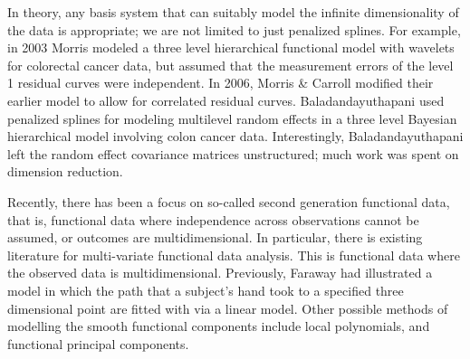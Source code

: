 In theory, any basis system that can suitably model the infinite dimensionality of the data is appropriate; 
we are not limited to just penalized splines.  
For example, in 2003 Morris modeled a three level hierarchical functional model with wavelets for colorectal cancer data, but assumed that the measurement errors of the level 1 residual curves were independent\cite{morris_wavelet-based_2003}.  
In 2006, Morris \& Carroll modified their earlier model to allow for correlated residual curves\cite{morris_wavelet-based_2006}.  Baladandayuthapani used penalized splines for modeling multilevel random effects in a three level Bayesian hierarchical model involving colon cancer data\cite{baladandayuthapani_bayesian_2008}.  
Interestingly, Baladandayuthapani left the random effect covariance matrices unstructured; much work was spent on dimension reduction.  

Recently, there has been a focus on so-called second generation functional data, that is, functional data where independence across observations cannot be assumed, or outcomes are multidimensional.  
In particular, there is existing literature for multi-variate functional data analysis.  
This is functional data where the observed data is multidimensional\cite{koner_second-generation_2023}.  
Previously, Faraway had illustrated a model in which the path that a subject's hand took to a specified three dimensional point are fitted with via a linear model\cite{faraway_regression_1997}.  
Other possible methods of modelling the smooth functional components include local polynomials, and functional principal components\cite{liu_functional_2012}.